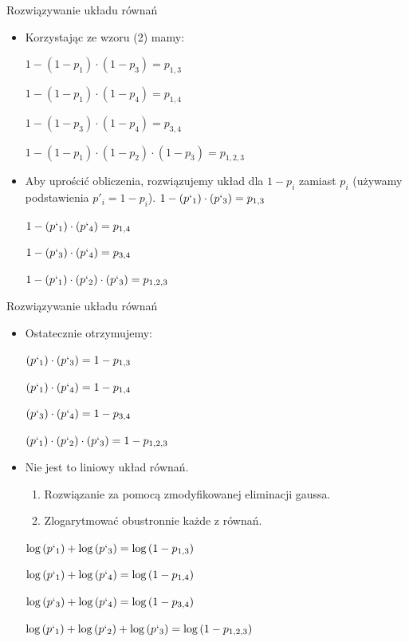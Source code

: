 \documentclass{beamer}
\begin{document}
\begin{frame}{Rozwiązywanie układu równań}
	\begin{itemize}
		\item Korzystając ze wzoru (2) mamy:

		$1 - (1-p_1)\cdot(1-p_3) = p_{1,3}$

		$1 - (1-p_1)\cdot(1-p_4) = p_{1,4}$

		$1 - (1-p_3)\cdot(1-p_4) = p_{3,4}$

		$1 - (1-p_1)\cdot(1-p_2)\cdot(1-p_3) = p_{1,2,3}$

		\pause \item Aby uprościć obliczenia, rozwiązujemy układ dla $1-p_i$ zamiast $p_i$ (używamy podstawienia $p'_i = 1 - p_i$).
		\pause
		$1 - (p`_1)\cdot(p`_3) = p_{1,3}$

		$1 - (p`_1)\cdot(p`_4) = p_{1,4}$

		$1 - (p`_3)\cdot(p`_4) = p_{3,4}$

		$1 - (p`_1)\cdot(p`_2)\cdot(p`_3) = p_{1,2,3}$
	\end{itemize}
\end{frame}

\begin{frame}{Rozwiązywanie układu równań}
	\begin{itemize}
	\item
		Ostatecznie otrzymujemy:

		$(p`_1)\cdot(p`_3) = 1 - p_{1,3}$

		$(p`_1)\cdot(p`_4) = 1 - p_{1,4}$

		$(p`_3)\cdot(p`_4) = 1 - p_{3,4}$

		$(p`_1)\cdot(p`_2)\cdot(p`_3) = 1 - p_{1,2,3}$
	\item Nie jest to liniowy układ równań. 
	\begin{enumerate}
		\item Rozwiązanie za pomocą zmodyfikowanej eliminacji gaussa.
		\item Zlogarytmować obustronnie każde z równań.
	\end{enumerate}
		
		$\log{(p`_1)} + \log{(p`_3)} = \log{(1 - p_{1,3}) }$

		$\log{(p`_1)} + \log{(p`_4)} = \log{(1 - p_{1,4}) }$

		$\log{(p`_3)} + \log{(p`_4)} = \log{(1 - p_{3,4}) }$

		$\log{(p`_1)} + \log{(p`_2)} + \log{(p`_3)} = \log{(1 - p_{1,2,3}) }$

	\end{itemize}
\end{frame}
\end{document}
